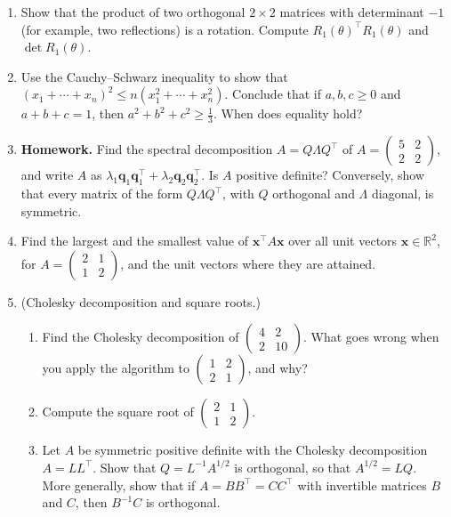 \documentclass[11pt]{article}
\newcommand{\homework}{\textcolor{red!70!black}{\textbf{Homework.}}}
\theoremstyle{definition}
\theoremstyle{plain}
\theoremstyle{remark}
\begin{document}
\begin{enumerate}[leftmargin=*]
    \item Show that the product of two orthogonal $2 \times 2$ matrices with determinant $-1$ (for example, two reflections) is a rotation. Compute $R_1(\theta)^\top R_1(\theta)$ and $\det R_1(\theta)$.
    \item Use the Cauchy--Schwarz inequality to show that $(x_1 + \cdots + x_n)^2 \leq n(x_1^2 + \cdots + x_n^2)$. Conclude that if $a, b, c \geq 0$ and $a + b + c = 1$, then $a^2 + b^2 + c^2 \geq \frac{1}{3}$. When does equality hold?
    \item \homework{} Find the spectral decomposition $A = Q\Lambda Q^\top$ of $A = \begin{pmatrix} 5 & 2 \\ 2 & 2 \end{pmatrix}$, and write $A$ as $\lambda_1 \mathbf{q}_1 \mathbf{q}_1^\top + \lambda_2 \mathbf{q}_2 \mathbf{q}_2^\top$. Is $A$ positive definite? Conversely, show that every matrix of the form $Q\Lambda Q^\top$, with $Q$ orthogonal and $\Lambda$ diagonal, is symmetric.
    \item Find the largest and the smallest value of $\mathbf{x}^\top A \mathbf{x}$ over all unit vectors $\mathbf{x} \in \mathbb{R}^2$, for $A = \begin{pmatrix} 2 & 1 \\ 1 & 2 \end{pmatrix}$, and the unit vectors where they are attained.
    \item\label{ex2:sqrt-cholesky} (Cholesky decomposition and square roots.)
    \begin{enumerate}
        \item Find the Cholesky decomposition of $\begin{pmatrix} 4 & 2 \\ 2 & 10 \end{pmatrix}$. What goes wrong when you apply the algorithm to $\begin{pmatrix} 1 & 2 \\ 2 & 1 \end{pmatrix}$, and why?
        \item Compute the square root of $\begin{pmatrix} 2 & 1 \\ 1 & 2 \end{pmatrix}$.
        \item Let $A$ be symmetric positive definite with the Cholesky decomposition $A = LL^\top$. Show that $Q = L^{-1}A^{1/2}$ is orthogonal, so that $A^{1/2} = LQ$. More generally, show that if $A = BB^\top = CC^\top$ with invertible matrices $B$ and $C$, then $B^{-1}C$ is orthogonal.

\end{enumerate}
\end{enumerate}
\end{document}
